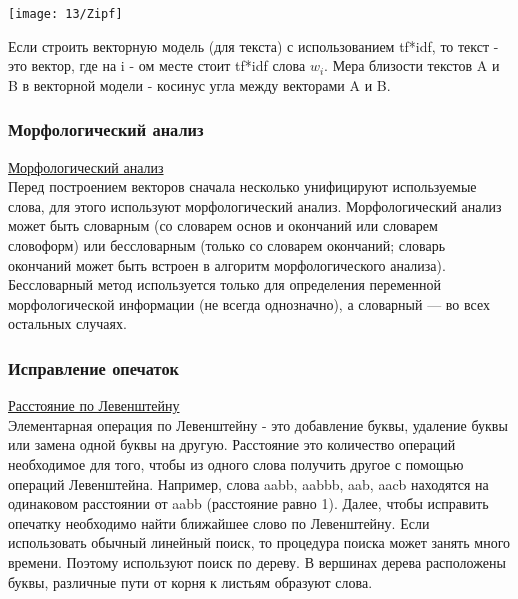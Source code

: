 \begin{center}
\texttt{[image: 13/Zipf]}
\end{center}
Если строить векторную модель (для текста) с использованием tf*idf, то текст - это вектор, где на i - ом месте стоит tf*idf слова $w_i$. Мера близости текстов A и B в векторной модели - косинус угла между векторами A и B.

\subsubsection {Морфологический анализ}
\href{http://prutzkow.com/ru-ru/science/natural-language-processing/morphology/}{Морфологический анализ} \\
Перед построением векторов сначала несколько унифицируют используемые слова, для этого используют морфологический анализ.
Морфологический анализ может быть словарным (со словарем основ и окончаний или словарем словоформ) или бессловарным (только со словарем окончаний; словарь окончаний может быть встроен в алгоритм морфологического анализа). Бессловарный метод используется только для определения переменной морфологической информации (не всегда однозначно), а словарный — во всех остальных случаях. 

\subsubsection {Исправление опечаток}
\href{https://clck.ru/A6RjQ}{Расстояние по Левенштейну} \\
Элементарная операция по Левенштейну - это добавление буквы, удаление буквы или замена одной буквы на другую. Расстояние это количество операций необходимое для того, чтобы из одного слова получить другое с помощью операций Левенштейна. Например, слова aabb, aabbb, aab, aacb находятся на одинаковом расстоянии от aabb (расстояние равно 1). Далее, чтобы исправить опечатку необходимо найти ближайшее слово по Левенштейну. Если использовать обычный линейный поиск, то процедура поиска может занять много времени. Поэтому используют поиск по дереву. В вершинах дерева расположены буквы, различные пути от корня к листьям образуют слова. 

